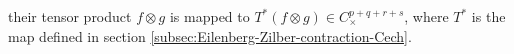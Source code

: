 \begin{defn}
\begin{itemize}
their tensor product $f\otimes g$ is mapped to $T^{\ast} (f\otimes g)\in C_{\times}^{p+q+r+s}$, where $T^{\ast}$ is the map defined in section \ref{subsec:Eilenberg-Zilber-contraction-Cech}.



\end{itemize}
\end{defn}
